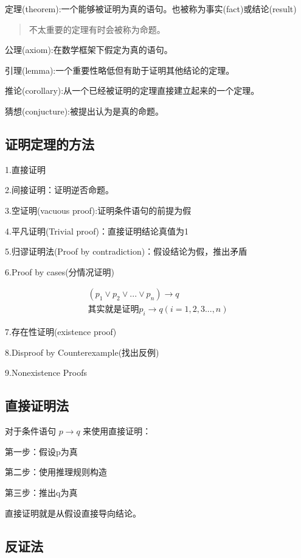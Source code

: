 \documentclass[12pt,a4paper,oneside]{ctexart}
\begin{document}
定理(theorem):一个能够被证明为真的语句。也被称为事实(fact)或结论(result)

\begin{quote}
不太重要的定理有时会被称为命题。
\end{quote}

公理(axiom):在数学框架下假定为真的语句。

引理(lemma):一个重要性略低但有助于证明其他结论的定理。

推论(corollary):从一个已经被证明的定理直接建立起来的一个定理。

猜想(conjucture):被提出认为是真的命题。

\subsection*{证明定理的方法}

1.直接证明

2.间接证明：证明逆否命题。

3.空证明(vacuous proof):证明条件语句的前提为假

4.平凡证明(Trivial proof)：直接证明结论真值为1

5.归谬证明法(Proof by contradiction)：假设结论为假，推出矛盾

6.Proof by cases(分情况证明)

\[\begin{gathered}
(p_1\vee p_2\vee...\vee p_n)\rightarrow q\\
其实就是证明p_i\rightarrow q(i=1,2,3...,n)
\end{gathered}\]

7.存在性证明(existence proof)

8.Disproof by Counterexample(找出反例)

9.Nonexistence Proofs

\subsection*{直接证明法}

对于条件语句 \(p\rightarrow q\) 来使用直接证明：

第一步：假设p为真

第二步：使用推理规则构造

第三步：推出q为真

直接证明就是从假设直接导向结论。

\subsection*{反证法}
\end{document}
